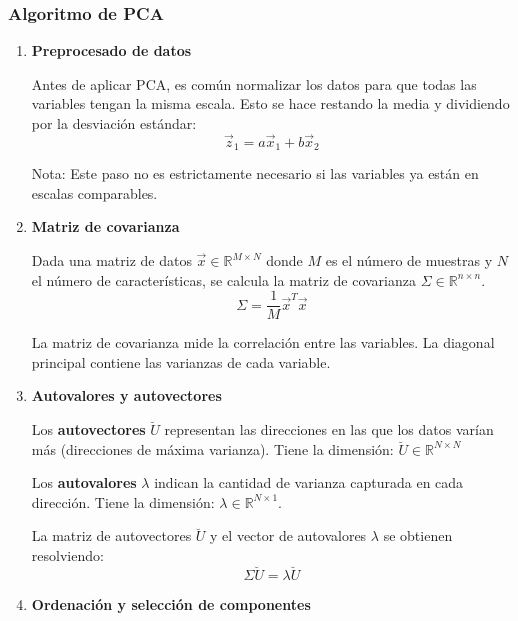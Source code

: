 \subsubsection{Algoritmo de PCA}
\begin{enumerate}
\item \textbf{Preprocesado de datos}

Antes de aplicar PCA, es común normalizar los datos para que todas las variables tengan la misma escala. Esto se hace restando la media y dividiendo por la desviación estándar:
$$\vec{z}_1 = a\vec{x}_1 + b\vec{x}_2$$

Nota: Este paso no es estrictamente necesario si las variables ya están en escalas comparables.

\item \textbf{Matriz de covarianza}

Dada una matriz de datos $\vec{x} \in \mathbb{R}^{M \times N}$ donde $M$ es el número de muestras y $N$ el número de características, se calcula la matriz de covarianza $\Sigma \in \mathbb{R}^{n \times n}$.
$$\Sigma = \frac{1}{M}\vec{x}^T \vec{x}$$

La matriz de covarianza mide la correlación entre las variables.
La diagonal principal contiene las varianzas de cada variable.

\item \textbf{Autovalores y autovectores}

Los \textbf{autovectores} $\breve{U}$ representan las direcciones en las que los datos varían más (direcciones de máxima varianza). Tiene la dimensión: $\breve{U} \in \mathbb{R}^{N \times N}$

Los \textbf{autovalores} $\lambda$ indican la cantidad de varianza capturada en cada dirección. Tiene la dimensión: $\lambda \in \mathbb{R}^{N \times 1}$.

La matriz de autovectores $\breve{U}$ y el vector de autovalores $\lambda$ se obtienen resolviendo:
$$\Sigma \breve{U} = \lambda \breve{U}$$


\item \textbf{Ordenación y selección de componentes}


\end{enumerate}
